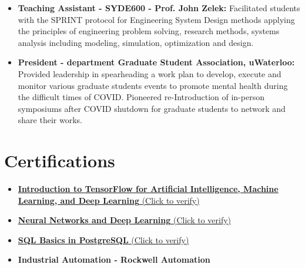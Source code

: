 \documentclass{ExpressiveResume}
\begin{document}
\begin{itemize}
\item {\textbf{Teaching Assistant - SYDE600 - Prof. John Zelek:} Facilitated students with the SPRINT protocol for Engineering System Design methods applying the principles of engineering problem solving, research methods, systems analysis including modeling, simulation, optimization and design.}
\item {\textbf{President - department Graduate Student Association, uWaterloo:} Provided leadership in spearheading a work plan to develop, execute and monitor various graduate students events to promote mental health during the difficult times of COVID. Pioneered re-Introduction of in-person symposiums after COVID shutdown for graduate students to network and share their works.}
\newline


\end{itemize}


\section{\textcolor{link_blue}{Certifications}}
\begin{itemize}
\item {\href{https://www.coursera.org/account/accomplishments/verify/C7C8CPGARXJW?utm_source=link&utm_medium=certificate&utm_content=cert_image&utm_campaign=pdf_header_button&utm_product=course}{\textbf{Introduction to TensorFlow for Artificial Intelligence, Machine Learning, and Deep Learning} (Click to verify)}}
\item {\href{https://www.coursera.org/account/accomplishments/verify/ZRBWP4ZFF8YX}{\textbf{Neural Networks and Deep Learning} (Click to verify)}}
\item {\href{https://learnsql.com/files/course-certificate/dcQdkgNWcDbdVjeWXGwKXFTHqxkLQXbYCCJYexdB}{\textbf{SQL Basics in PostgreSQL} (Click to verify)}}
\item {\textbf{Industrial Automation - Rockwell Automation}}
\newline

\end{itemize}
\end{document}
